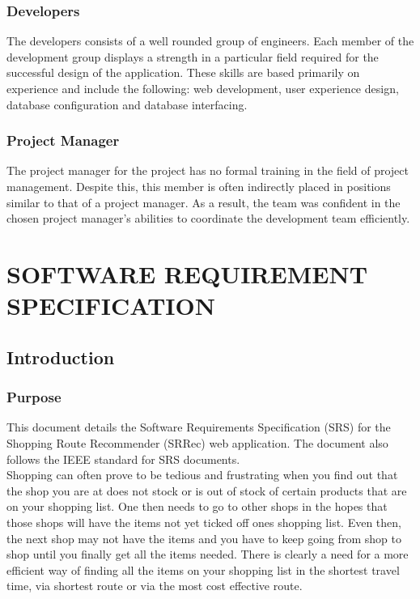 \documentclass[10pt,twocolumn]{witseiepaper}
\begin{document}
		\subsubsection{Developers} The developers consists of a well rounded group of engineers. Each member of the development group displays a strength in a particular field required for the successful design of the application. These skills are based primarily on experience and include the following: web development, user experience design, database configuration and database interfacing.\\ 
		
		\subsubsection{Project Manager} The project manager for the project has no formal training in the field of project management. Despite this, this member is often indirectly placed in positions similar to that of a project manager. As a result, the team was confident in the chosen project manager's abilities to coordinate the development team efficiently. \\

\section{SOFTWARE REQUIREMENT SPECIFICATION}
	
	\subsection{Introduction}
		
		\subsubsection{Purpose}
		
			This document details the Software Requirements Specification (SRS) for the Shopping Route Recommender (SRRec) web application. The document also follows the IEEE standard for SRS documents.\\
			
			Shopping can often prove to be tedious and frustrating when you find out that the shop you are at does not stock or is out of stock of certain products that are on your shopping list. One then needs to go to other shops in the hopes that those shops will have the items not yet ticked off ones shopping list. Even then, the next shop may not have the items and you have to keep going from shop to shop until you finally get all the items needed. There is clearly a need for a more efficient way of finding all the items on your shopping list in the shortest travel time, via shortest route or via the most cost effective route.\\
			
\end{document}
